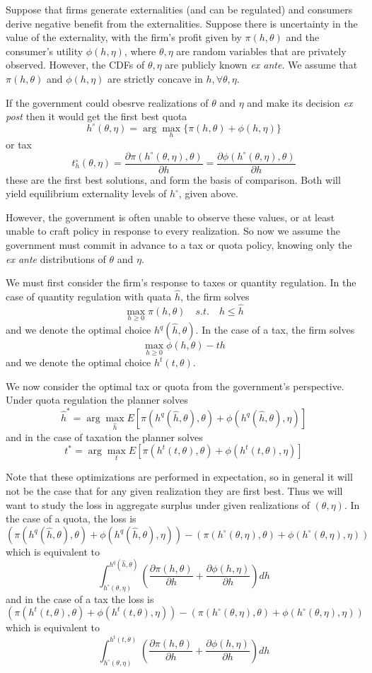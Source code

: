 Suppose that firms generate externalities (and can be regulated) and
consumers derive negative benefit from the externalities. Suppose
there is uncertainty in the value of the externality, with the firm's
profit given by $\pi(h, \theta)$ and the consumer's utility $\phi(h,
\eta)$, where $\theta, \eta$ are random variables that are privately
observed. However, the CDFs of $\theta, \eta$ are publicly known
\textit{ex ante}. We assume that $\pi(h,\theta)$ and $\phi(h, \eta)$
are strictly concave in $h, \forall \theta, \eta$.

If the government could obesrve realizations of $\theta$ and $\eta$
and make its decision \textit{ex post} then it would get the first
best quota
\[
h^\circ(\theta, \eta) = \arg \max_h \{ \pi(h, \theta) + \phi(h, \eta) \}
\]
or tax
\[
t_h^\circ(\theta, \eta) 
= \frac{\partial \pi(h^\circ(\theta, \eta), \theta)}{\partial h}
= \frac{\partial \phi(h^\circ(\theta, \eta), \theta)}{\partial h}
\]
these are the first best solutions, and form the basis of
comparison. Both will yield equilibrium externality levels of
$h^\circ$, given above.


However, the government is often unable to observe these values, or at
least unable to craft policy in response to every realization. So now
we assume the government must commit in advance to a tax or quota
policy, knowing only the \textit{ex ante} distributions of $\theta$
and $\eta$. 

We must first consider the firm's response to taxes or quantity
regulation. In the case of quantity regulation with quata $\hat h$,
the firm solves
\[
\max_{h \geq 0} \pi(h, \theta) \quad s.t. \quad h \leq \hat h
\]
and we denote the optimal choice $h^q(\hat h, \theta)$. In the case of
a tax, the firm solves
\[
\max_{h \geq 0} \phi(h, \theta) - th
\]
and we denote the optimal choice $h^t(t, \theta)$. 


We now consider the optimal tax or quota from the government's
perspective. Under quota regulation the planner solves
\[
\hat h^* = \arg \max_{\hat h}
E \left[ \pi(h^q(\hat h, \theta), \theta) 
+ \phi(h^q(\hat h, \theta), \eta) \right]
\]
and in the case of taxation the planner solves
\[
t^* = \arg \max_t
E \left[ \pi(h^t(t, \theta), \theta)
+ \phi(h^t(t, \theta), \eta) \right]
\]

Note that these optimizations are performed in expectation, so in
general it will not be the case that for any given realization they
are first best. Thus we will want to study the loss in aggregate
surplus under given realizations of $(\theta, \eta)$. In the case of a
quota, the loss is
\[
(\pi(h^q(\hat h, \theta), \theta) + \phi(h^q(\hat h, \theta), \eta))
- (\pi(h^\circ(\theta, \eta), \theta) + \phi(h^\circ(\theta, \eta), \eta))
\]
which is equivalent to
\[
\int_{h^\circ(\theta, \eta)}^{h^q(\hat h, \theta)}
\left( \frac{\partial \pi(h, \theta)}{\partial h}
+ \frac{\partial \phi(h, \eta)}{\partial h} \right) dh
\]
and in the case of a tax the loss is
\[
(\pi(h^t(t, \theta), \theta) + \phi(h^t(t, \theta), \eta))
- (\pi(h^\circ(\theta, \eta), \theta) + \phi(h^\circ(\theta, \eta), \eta))
\]
which is equivalent to
\[
\int_{h^\circ(\theta, \eta)}^{h^t(t, \theta)}
\left( \frac{\partial \pi(h, \theta)}{\partial h}
+ \frac{\partial \phi(h, \eta)}{\partial h} \right) dh
\]


